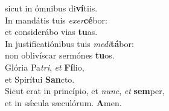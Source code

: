 \evenverse sicut in ómnibus di\textbf{ví}tiis.\\
\oddverse In mandátis tuis \textit{e}\textit{xer}\textbf{cé}bor:~\*\\
\oddverse et considerábo vias \textbf{tu}as.\\
\evenverse In justificatiónibus tuis \textit{me}\textit{di}\textbf{tá}bor:~\*\\
\evenverse non oblivíscar sermónes \textbf{tu}os.\\
\oddverse Glória Pa\textit{tri}, \textit{et} \textbf{Fí}lio,~\*\\
\oddverse et Spirítui \textbf{San}cto.\\
\evenverse Sicut erat in princípio, et \textit{nunc}, \textit{et} \textbf{sem}per,~\*\\
\evenverse et in sǽcula sæculórum. \textbf{A}men.\\
